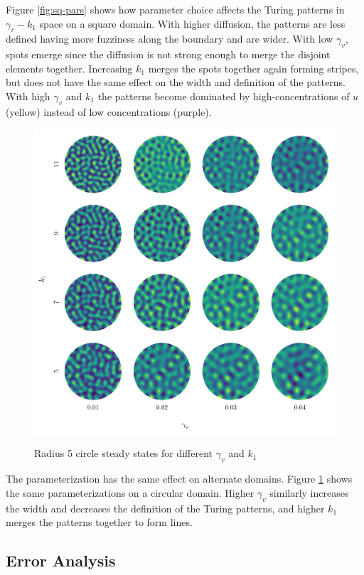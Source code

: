 Figure \ref{fig:sq-pars} shows how parameter choice affects the Turing patterns in $\gamma_v - k_1$ space on a square domain. With higher diffusion, the patterns are less defined having more fuzziness along the boundary and are wider. With low $\gamma_v$, spots emerge since the diffusion is not strong enough to merge the disjoint elements together. Increasing $k_1$ merges the spots together again forming stripes, but does not have the same effect on the width and definition of the patterns. With high $\gamma_v$ and $k_1$ the patterns become dominated by high-concentrations of $u$ (yellow) instead of low concentrations (purple).

\begin{figure}[t!]
    \centering
    \caption{Radius 5 circle steady states for different $\gamma_v$ and $k_1$}
    \includegraphics{figures/circle_params.pdf}
    \label{fig:cir-pars}
\end{figure}

The parameterization has the same effect on alternate domains. Figure \ref{fig:cir-pars} shows the same parameterizations on a circular domain. Higher $\gamma_v$ similarly increases the width and decreases the definition of the Turing patterns, and higher $k_1$ merges the patterns together to form lines.


\subsection{Error Analysis} \label{subsec:err}

